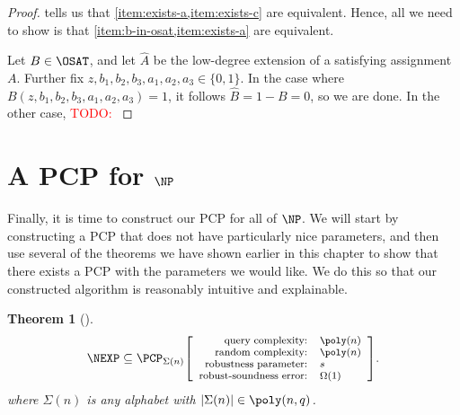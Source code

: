\documentclass[english,12pt]{reedthesis}
\theoremstyle{plain}
\newtheorem{thm}{Theorem}[section]
\theoremstyle{definition}
\theoremstyle{remark}
\DeclarePairedDelimiter{\abs}{\lvert}{\rvert}
\newcommand{\pcpr}[4]{%
  \ensuremath%
  \mleft[{\footnotesize\begin{array}{r l}
    \text{query complexity:} & #1 \\
    \text{random complexity:} & #2 \\
    \text{robustness parameter:} & #3 \\
    \text{robust-soundness error:} & #4
  \end{array}}\mright]%
}
\newcommand{\TODO}[1]{\textcolor{red}{TODO: #1}}
\begin{document}
\begin{proof}
   tells us that \cref{item:exists-a,item:exists-c} are
  equivalent. Hence, all we need to show is that
  \cref{item:b-in-osat,item:exists-a} are equivalent.

  Let $B \in \OSAT$, and let $\hat{A}$ be the low-degree extension of a satisfying
  assignment $A$. Further fix
  $z, b_{1}, b_{2}, b_{3}, a_{1}, a_{2}, a_{3} \in \{0, 1\}$. In the case where
  $B(z, b_{1}, b_{2}, b_{3}, a_{1}, a_{2}, a_{3}) = 1$, it follows
  $\hat{B} = 1 - B = 0$, so we are done. In the other case,
  \TODO{}
\end{proof}

\section{A PCP for $\NP$}

Finally, it is time to construct our PCP for all of $\NP$. We will start by
constructing a PCP that does not have particularly nice parameters, and then use
several of the theorems we have shown earlier in this chapter to show that there
exists a PCP with the parameters we would like. We do this so that our
constructed algorithm is reasonably intuitive and explainable.

\begin{thm}[{\cite[Theorem 6.3]{GOS25}}]\label{thm:nexp-pcp}
  \[
    \NEXP \subseteq
    \PCP_{\Sigma(n)}\pcpr{\poly(n)}{\poly(n)}{s}{\Omega(1)}.
  \]
  where $\Sigma(n)$ is any alphabet with $\abs{\Sigma(n)} \in \poly(n, q)$.
\end{thm}
\end{document}
